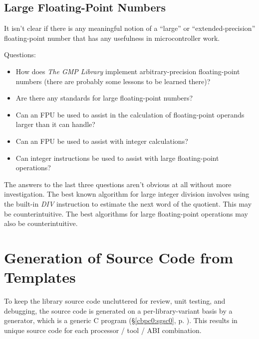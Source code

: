 \subsection{Large Floating-Point Numbers}
\label{cldd0:srnm0:sfpl0}

It isn't clear if there is any meaningful notion of a 
``large'' or ``extended-precision'' floating-point number 
that has any usefulness in microcontroller work.  

Questions:

\begin{itemize}
\item How does \emph{The GMP Library} implement
      arbitrary-precision floating-point numbers (there are 
      probably some lessons to be learned there)?
\item Are there any standards for large
      floating-point numbers?
\item Can an FPU be used to assist in the calculation of
      floating-point operands larger than it can handle?
\item Can an FPU be used to assist with integer
      calculations?
\item Can integer instructions be used to assist with large
      floating-point operations?
\end{itemize}

The answers to the last three questions aren't obvious at 
all without more investigation.  The best known algorithm 
for large integer division involves using the built-in 
\emph{DIV} instruction to estimate the next word of the 
quotient.  This may be counterintuitive.  The best 
algorithms for large floating-point operations may also be 
counterintuitive.  


\section{Generation of Source Code from Templates}
\label{cldd0:sgst0}

To keep the library source code uncluttered for review, unit 
testing, and debugging, the source code is generated on a 
per-library-variant basis by a generator, which is a generic 
C program (\S{}\ref{cbpc0:sgsc0}, p.  
\pageref{cbpc0:sgsc0}).  This results in unique source code 
for each processor / tool / ABI combination.  

